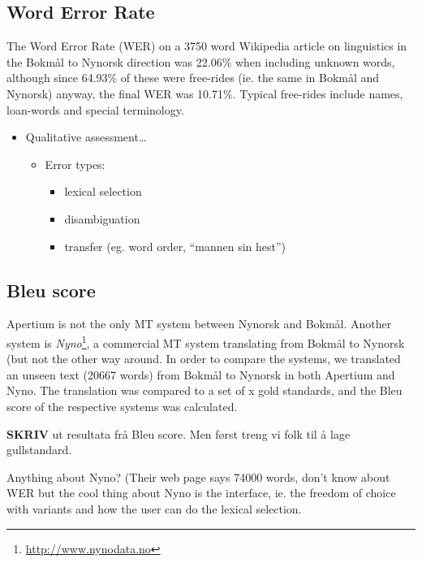 \documentclass[11pt]{article}
\begin{document}
\subsection{Word Error Rate}
The Word Error Rate (WER) on a 3750 word Wikipedia article on
linguistics in the Bokmål to Nynorsk direction was 22.06\% when
including unknown words, although since 64.93\% of these were
free-rides (ie. the same in Bokmål and Nynorsk) anyway, the final WER
was 10.71\%. Typical free-rides include names, loan-words and special
terminology.

\begin{itemize}
\item Qualitative assessment\ldots{}

\begin{itemize}
\item Error types:

\begin{itemize}
\item lexical selection
\item disambiguation
\item transfer (eg. word order, ``mannen sin hest'')
\end{itemize}

\end{itemize}


\end{itemize}

\subsection{Bleu score}

Apertium is not the only MT system between Nynorsk and Bokmål. Another
system is
\textit{Nyno}\footnote{\href{http://www.nynodata.no}{http://www.nynodata.no}},
a commercial MT system translating from Bokmål to Nynorsk (but not the
other way around. In order to compare the systems, we translated an
unseen text (20667 words) from Bokmål to Nynorsk in both Apertium and
Nyno. The translation was compared to a set of x gold standards, and
the Bleu score of the respective systems was calculated.

\textbf{SKRIV} ut resultata frå Bleu score. Men først treng vi folk til å lage gullstandard.

Anything about Nyno? (Their web page says 74000 words, don't know
  about WER but the cool thing about Nyno is the interface, ie. the
  freedom of choice with variants and how the user can do the lexical
  selection.
  
\end{document}

